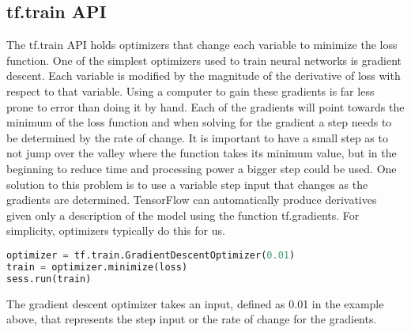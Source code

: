 \subsection{tf.train API}
The tf.train API holds optimizers that change each variable to minimize the loss function.
One of the simplest optimizers used to train neural networks is gradient descent.
Each variable is modified by the magnitude of the derivative of loss with respect to that variable.
Using a computer to gain these gradients is far less prone to error than doing it by hand.
Each of the gradients will point towards the minimum of the loss function and when solving for the gradient a step needs to be determined by the rate of change.
It is important to  have a small step as to not jump over the valley where the function takes its minimum value,
but in the beginning to reduce time and processing power a bigger step could be used.
One solution to this problem is to use a variable step input that changes as the gradients are determined.
TensorFlow can automatically produce derivatives given only a description of the model using the function tf.gradients.
For simplicity, optimizers typically do this for us.
\begin{lstlisting}[language=Python, caption=The gradient descent optimizer.]
optimizer = tf.train.GradientDescentOptimizer(0.01)
train = optimizer.minimize(loss)
sess.run(train)
\end{lstlisting}
The gradient descent optimizer takes an input, defined as 0.01 in the example above,
that represents the step input or the rate of change for the gradients.

